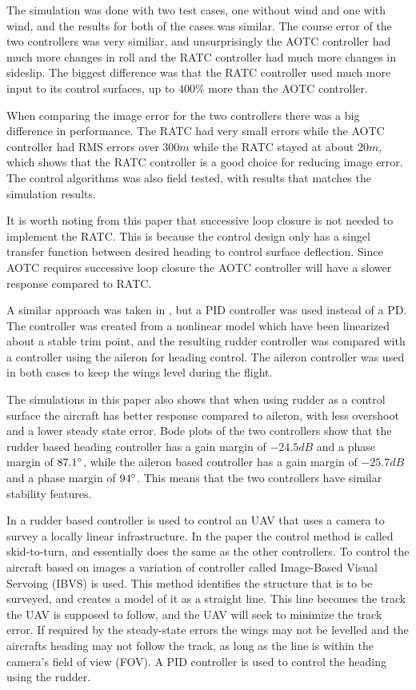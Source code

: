 The simulation was done with two test cases, one without wind and one with wind, and the results for both of the cases was similar. The course error of the two controllers was very similiar, and unsurprisingly the AOTC controller had much more changes in roll and the RATC controller had much more changes in sideslip. The biggest difference was that the RATC controller used much more input to its control surfaces, up to $400 \%$ more than the AOTC controller.

When comparing the image error for the two controllers there was a big difference in performance. The RATC had very small errors while the AOTC controller had RMS errors over $300 m$ while the RATC stayed at about $20 m$, which shows that the RATC controller is a good choice for reducing image error. The control algorithms was also field tested, with results that matches the simulation results.

It is worth noting from this paper that successive loop closure is not needed to implement the RATC. This is because the control design only has a singel transfer function between desired heading to control surface deflection. Since AOTC requires successive loop closure the AOTC controller will have a slower response compared to RATC.

A similar approach was taken in \cite{alternateSurfaceAhsan}, but a PID controller was used instead of a PD. The controller was created from a nonlinear model which have been linearized about a stable trim point, and the resulting rudder controller was compared with a controller using the aileron for heading control. The aileron controller was used in both cases to keep the wings level during the flight.

The simulations in this paper also shows that when using rudder as a control surface the aircraft has better response compared to aileron, with less overshoot and a lower steady state error. Bode plots of the two controllers show that the rudder based heading controller has a gain margin of $-24.5 dB$ and a phase margin of $87.1 \degree$, while the aileron based controller has a gain margin of $-25.7 dB$ and a phase margin of $94 \degree$. This means that the two controllers have similar stability features.

In \cite{skidToTurnMills} a rudder based controller is used to control an UAV that uses a camera to survey a locally linear infrastructure. In the paper the control method is called skid-to-turn, and essentially does the same as the other controllers. To control the aircraft based on images a variation of controller called Image-Based Visual Servoing (IBVS) is used. This method identifies the structure that is to be surveyed, and creates a model of it as a straight line. This line becomes the track the UAV is supposed to follow, and the UAV will seek to minimize the track error. If required by the steady-state errors the wings may not be levelled and the aircrafts heading may not follow the track, as long as the line is within the camera's field of view (FOV). A PID controller is used to control the heading using the rudder.

